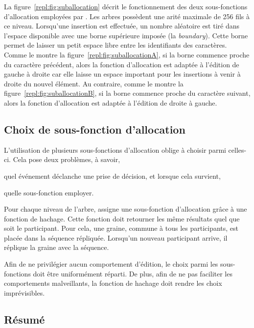 La figure~\ref{repl:fig:suballocation} décrit le fonctionnement des deux
sous-fonctions d'allocation employées par \LSEQ. Les arbres possèdent une arité
maximale de 256 fils à ce niveau. Lorsqu'une insertion est effectuée, un nombre
aléatoire est tiré dans l'espace disponible avec une borne supérieure imposée
(la \emph{boundary}). Cette borne permet de laisser un petit espace libre entre
les identifiants des caractères.%
Comme le montre la figure~\ref{repl:fig:suballocationA}, si la borne commence
proche du caractère précédent, alors la fonction d'allocation est adaptée à
l'édition de gauche à droite car elle laisse un espace important pour les
insertions à venir à droite du nouvel élément. Au contraire, comme le montre la
figure~\ref{repl:fig:suballocationB}, si la borne commence proche du caractère
suivant, alors la fonction d'allocation est adaptée à l'édition de droite à
gauche.

\subsection{Choix de sous-fonction d'allocation}
\label{repl:subsec:allocationchoice}

L'utilisation de plusieurs sous-fonctions d'allocation oblige à choisir parmi
celles-ci. Cela pose deux problèmes, à savoir,
\begin{inparaenum}[(i)]
\item quel événement déclanche une prise de décision, et lorsque cela survient, 
\item quelle sous-fonction employer.
\end{inparaenum}

Pour chaque niveau de l'arbre, \LSEQ assigne une sous-fonction d'allocation
grâce à une fonction de hachage. Cette fonction doit retourner les même
résultats quel que soit le participant. Pour cela, une graine, commune à tous
les participants, est placée dans la séquence répliquée. Lorsqu'un nouveau
participant arrive, il réplique la graine avec la séquence.

Afin de ne privilégier aucun comportement d'édition, le choix parmi les
sous-fonctions doit être uniformément réparti. De plus, afin de ne pas faciliter
les comportements malveillants, la fonction de hachage doit rendre les choix
imprévisibles.

\subsection{Résumé}

